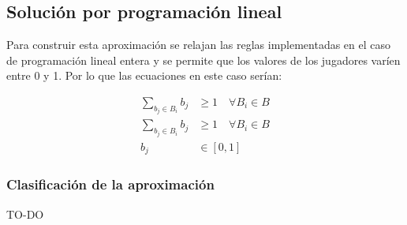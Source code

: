 \subsection{Solución por programación lineal}

Para construir esta aproximación se relajan las reglas implementadas en el caso de programación lineal entera y se permite que los valores de los jugadores varíen entre 0 y 1. Por lo que las ecuaciones en este caso serían:

\begin{align}
  \sum_{b_j \in B_i} b_j &\geq 1 \quad \forall B_i \in B \\
  \sum_{b_j \in B_i} b_j &\geq 1 \quad \forall B_i \in B \\
  b_j &\in [0,1] 
\end{align}
\subsubsection{Clasificación de la aproximación}

TO-DO

